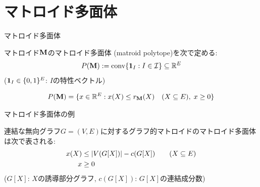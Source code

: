 \documentclass[14pt,aspectratio=169,xcolor=dvipsnames,table,onlytextwidth,dvipdfmx]{beamer}
\begin{document}

\section{マトロイド多面体}
\begin{frame}{マトロイド多面体}
    \begin{definition}
        マトロイド$\mathbf{M}$の\alert{マトロイド多面体 (matroid polytope)}を次で定める:
        \[
            P(\mathbf{M}) := \operatorname{conv}\{\mathbf{1}_I: I \in \mathcal{I} \} \subseteq \mathbb{R}^E
        \]
        {\footnotesize \hfill ($\mathbf{1}_I \in \{0,1\}^E$: $I$の特性ベクトル)}
    \end{definition}

    \bigskip
    \begin{theorem}[Edmonds (1970)]
        \[
            P(\mathbf{M}) = \{x \in \mathbb{R}^E: x(X) \leq r_{\mathbf{M}}(X) \quad (X \subseteq E), \; x \geq 0 \}
        \]
    \end{theorem}
\end{frame}

\begin{frame}{マトロイド多面体の例}
   
    
    \begin{example}[グラフ的マトロイド]
        連結な無向グラフ$G = (V, E)$に対するグラフ的マトロイドのマトロイド多面体は次で表される:
        \begin{alignat*}{2}
            x(X) &\leq \lvert V(G[X])\rvert - c(G[X]) &\quad (X \subseteq E)\\
            x &\geq 0 &
        \end{alignat*}
        {\footnotesize \hfill ($G[X]$: $X$の誘導部分グラフ, $c(G[X])$: $G[X]$の連結成分数)}
    \end{example}
\end{frame}
\end{document}
